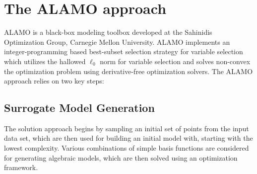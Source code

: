 \documentclass[a4paper,12pt]{article}
\begin{document}


\newpage
\section{The ALAMO approach}
ALAMO \cite{cozad2014learning,cozad2015combined,wilson2017alamo} is a black-box modeling toolbox developed at the Sahinidis Optimization Group, Carnegie Mellon University. ALAMO implements an integer-programming based best-subset selection strategy for variable selection which utilizes the hallowed $\ell_0$ norm for variable selection and solves non-convex the optimization problem using derivative-free optimization solvers. The ALAMO approach relies on two key steps:

\subsection{Surrogate Model Generation}
The solution approach begins by sampling an initial set of points from the input data set, which are then used for building an initial model with, starting with the lowest complexity. Various combinations of simple basis functions are considered for generating algebraic models, which are then solved using an optimization framework. 
\end{document}
